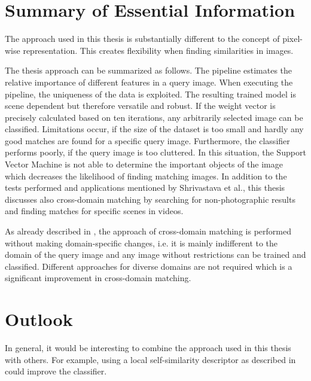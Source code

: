 



\section{Summary of Essential Information}
\label{sec:conclusion}

The approach used in this thesis is substantially different to  the concept of pixel-wise representation. This creates flexibility when finding similarities in images.

The thesis approach can be summarized as follows.
The pipeline estimates the relative importance of different features in a query image. When executing the pipeline, the uniqueness of the data is exploited. The resulting trained model is scene dependent but therefore versatile and robust. If the weight vector is precisely calculated based on ten iterations, any arbitrarily selected image can be classified. Limitations occur, if the size of the dataset is too small and hardly any good matches are found for a specific query image. Furthermore, the classifier performs poorly, if the query image is too cluttered. In this situation, the Support Vector Machine is not able to determine the important objects of the image which decreases the likelihood of finding matching images. In addition to the tests performed and applications mentioned by Shrivastava et al., this thesis discusses also cross-domain matching by searching for non-photographic results and finding matches for specific scenes in videos.

As already described in , the approach of cross-domain matching is performed without making domain-specific changes, i.e. it is mainly indifferent to the domain of the query image and any image without restrictions can be trained and classified. Different approaches for diverse domains are not required which is a significant improvement in cross-domain matching.


\section{Outlook}
\label{sec:futureWork}


In general, it would be interesting to combine the approach used in this thesis with others. For example, using a local self-similarity descriptor as described in  \cite{shechtman} could improve the classifier.


